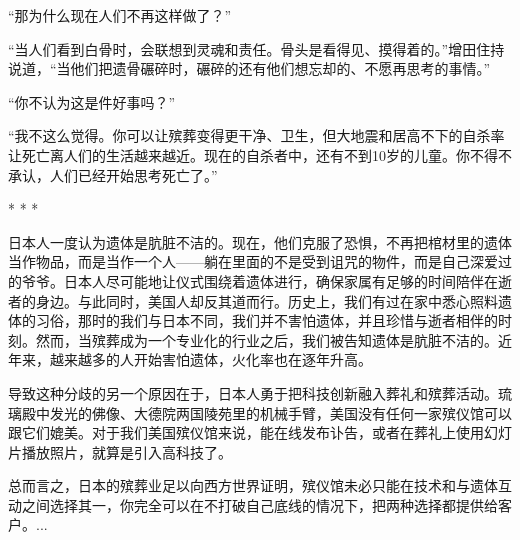 \documentclass[12pt,oneside]{book}
\begin{document}
\begin{bookref}[frametitle={\cite{好好告别：世界葬礼观察手记}}]
“那为什么现在人们不再这样做了？”

“当人们看到白骨时，会联想到灵魂和责任。骨头是看得见、摸得着的。”增田住持说道，“当他们把遗骨碾碎时，碾碎的还有他们想忘却的、不愿再思考的事情。”

“你不认为这是件好事吗？”

“我不这么觉得。你可以让殡葬变得更干净、卫生，但大地震和居高不下的自杀率让死亡离人们的生活越来越近。现在的自杀者中，还有不到10岁的儿童。你不得不承认，人们已经开始思考死亡了。”
\begin{center}
* * *
\end{center}

日本人一度认为遗体是肮脏不洁的。现在，他们克服了恐惧，不再把棺材里的遗体当作物品，而是当作一个人——躺在里面的不是受到诅咒的物件，而是自己深爱过的爷爷。日本人尽可能地让仪式围绕着遗体进行，确保家属有足够的时间陪伴在逝者的身边。与此同时，美国人却反其道而行。历史上，我们有过在家中悉心照料遗体的习俗，那时的我们与日本不同，我们并不害怕遗体，并且珍惜与逝者相伴的时刻。然而，当殡葬成为一个专业化的行业之后，我们被告知遗体是肮脏不洁的。近年来，越来越多的人开始害怕遗体，火化率也在逐年升高。

导致这种分歧的另一个原因在于，日本人勇于把科技创新融入葬礼和殡葬活动。琉璃殿中发光的佛像、大德院两国陵苑里的机械手臂，美国没有任何一家殡仪馆可以跟它们媲美。对于我们美国殡仪馆来说，能在线发布讣告，或者在葬礼上使用幻灯片播放照片，就算是引入高科技了。

总而言之，日本的殡葬业足以向西方世界证明，殡仪馆未必只能在技术和与遗体互动之间选择其一，你完全可以在不打破自己底线的情况下，把两种选择都提供给客户。...

\end{bookref}
\end{document}

